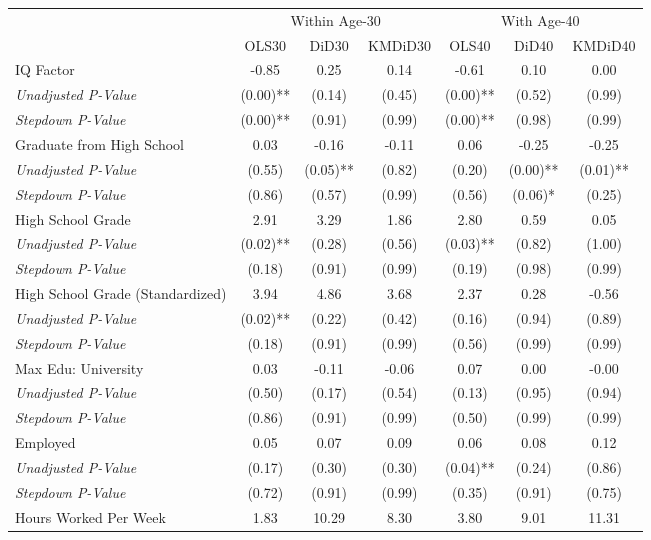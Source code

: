 \begin{tabular}{l c c c c c c}
\toprule
& \multicolumn{3}{c}{Within Age-30} & \multicolumn{3}{c}{With Age-40} \\\cmidrule(lr){2-4} \cmidrule(lr){5-7}
 & OLS30 & DiD30 & KMDiD30 & OLS40 & DiD40 & KMDiD40 \\
\midrule
IQ Factor & -0.85 & 0.25 & 0.14 & -0.61 & 0.10 & 0.00 \\
\quad \textit{Unadjusted P-Value} & (0.00)** & (0.14) & (0.45) & (0.00)** & (0.52) & (0.99) \\
\quad \textit{Stepdown P-Value} & (0.00)** & (0.91) & (0.99) & (0.00)** & (0.98) & (0.99) \\
Graduate from High School & 0.03 & -0.16 & -0.11 & 0.06 & -0.25 & -0.25 \\
\quad \textit{Unadjusted P-Value} & (0.55) & (0.05)** & (0.82) & (0.20) & (0.00)** & (0.01)** \\
\quad \textit{Stepdown P-Value} & (0.86) & (0.57) & (0.99) & (0.56) & (0.06)* & (0.25) \\
High School Grade & 2.91 & 3.29 & 1.86 & 2.80 & 0.59 & 0.05 \\
\quad \textit{Unadjusted P-Value} & (0.02)** & (0.28) & (0.56) & (0.03)** & (0.82) & (1.00) \\
\quad \textit{Stepdown P-Value} & (0.18) & (0.91) & (0.99) & (0.19) & (0.98) & (0.99) \\
High School Grade (Standardized) & 3.94 & 4.86 & 3.68 & 2.37 & 0.28 & -0.56 \\
\quad \textit{Unadjusted P-Value} & (0.02)** & (0.22) & (0.42) & (0.16) & (0.94) & (0.89) \\
\quad \textit{Stepdown P-Value} & (0.18) & (0.91) & (0.99) & (0.56) & (0.99) & (0.99) \\
Max Edu: University & 0.03 & -0.11 & -0.06 & 0.07 & 0.00 & -0.00 \\
\quad \textit{Unadjusted P-Value} & (0.50) & (0.17) & (0.54) & (0.13) & (0.95) & (0.94) \\
\quad \textit{Stepdown P-Value} & (0.86) & (0.91) & (0.99) & (0.50) & (0.99) & (0.99) \\
Employed & 0.05 & 0.07 & 0.09 & 0.06 & 0.08 & 0.12 \\
\quad \textit{Unadjusted P-Value} & (0.17) & (0.30) & (0.30) & (0.04)** & (0.24) & (0.86) \\
\quad \textit{Stepdown P-Value} & (0.72) & (0.91) & (0.99) & (0.35) & (0.91) & (0.75) \\
Hours Worked Per Week & 1.83 & 10.29 & 8.30 & 3.80 & 9.01 & 11.31 \\

\end{tabular}
